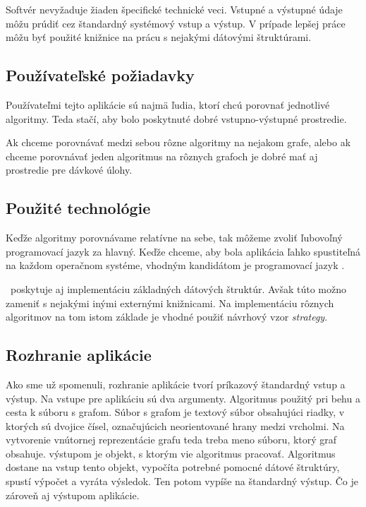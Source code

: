 Softvér nevyžaduje žiaden špecifické technické veci. Vstupné a výstupné údaje 
môžu prúdiť cez štandardný systémový vstup a výstup. V prípade lepšej práce 
môžu byť použité knižnice na prácu s nejakými dátovými štruktúrami.


\subsection{Používateľské požiadavky}

Používateľmi tejto aplikácie sú najmä ľudia, ktorí chcú porovnať jednotlivé 
algoritmy. Teda stačí, aby bolo poskytnuté dobré vstupno-výstupné prostredie.

Ak chceme porovnávať medzi sebou rôzne algoritmy na nejakom grafe, alebo ak 
chceme porovnávať jeden algoritmus na rôznych grafoch je dobré mať aj 
prostredie pre dávkové úlohy.


\subsection{Použité technológie}

Keďže algoritmy porovnávame relatívne na sebe, tak môžeme zvoliť ľubovoľný 
programovací jazyk za hlavný. Keďže chceme, aby bola aplikácia ľahko 
spustiteľná na každom operačnom systéme, vhodným kandidátom je programovací 
jazyk \Java .

\Java\ poskytuje aj implementáciu základných dátových štruktúr. Avšak túto možno 
zameniť s nejakými inými externými knižnicami. Na implementáciu rôznych 
algoritmov na tom istom základe je vhodné použiť návrhový vzor \emph{strategy}.


\subsection{Rozhranie aplikácie}

Ako sme už spomenuli, rozhranie aplikácie tvorí príkazový štandardný vstup a 
výstup. Na vstupe pre aplikáciu sú dva argumenty. Algoritmus použitý pri behu a 
cesta k súboru s grafom. Súbor s grafom je textový súbor obsahujúci riadky, 
v ktorých sú dvojice čísel, označujúcich neorientované hrany medzi vrcholmi. 
Na vytvorenie vnútornej reprezentácie grafu teda treba meno súboru, ktorý graf 
obsahuje. výstupom je objekt, s ktorým vie algoritmus pracovať. Algoritmus 
dostane na vstup tento objekt, vypočíta potrebné pomocné dátové štruktúry, 
spustí výpočet a vyráta výsledok. Ten potom vypíše na štandardný výstup. Čo je 
zároveň aj výstupom aplikácie.

